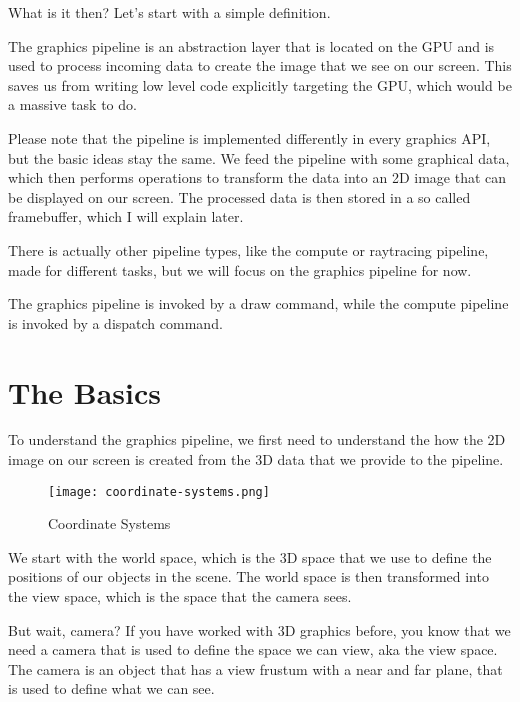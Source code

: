 \documentclass[12pt]{report} \usepackage{preamble}
\begin{document}
What is it then? Let's start with a simple definition.

The graphics pipeline is an abstraction layer that is located on the
GPU and is used to process incoming data to create the image that we see
on our screen. \cite{vkGuide} This saves us from writing low level code
explicitly targeting the GPU, which would be a massive task to do.

Please note that the pipeline is implemented differently in every graphics
API, but the basic ideas stay the same. We feed the pipeline with some
graphical data, which then performs operations to transform the data into
an 2D image that can be displayed on our screen. The processed data
is then stored in a so called framebuffer, which I will explain later.
\cite{vkGuide}

There is actually other pipeline types, like the compute or raytracing
pipeline, made for different tasks, but we will focus on the graphics
pipeline for now.

The graphics pipeline is invoked by a draw command,
while the compute pipeline is invoked by a dispatch
command. \cite{build-pipeline} \\
\cite{vulkan-tutorial-compute-shader}

\section{The Basics}

To understand the graphics pipeline, we first need to understand the
how the 2D image on our screen is created from the 3D data that we
provide to the pipeline.

\begin{figure}[hbtp]
	\centering \texttt{[image: coordinate-systems.png]}
	\caption{Coordinate Systems \cite{fig:view-frustum}}
\end{figure}
\FloatBarrier

We start with the world space, which is the 3D space that we use to
define the positions of our objects in the scene. The world space is
then transformed into the view space, which is the space that the
camera sees. \cite{fig:view-frustum}

But wait, camera? If you have worked with 3D graphics before, you know
that we need a camera that is used to define the space we can view, aka
the view space. The camera is an object that has a view frustum
with a near and far plane, that is used to define what we can see.
\end{document}
